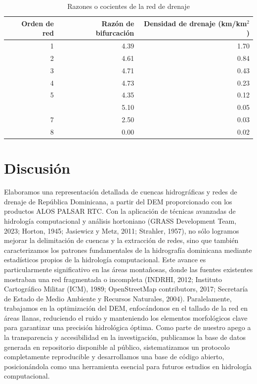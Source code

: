\documentclass[spanish]{article}
\begin{document}
\begin{table}[H]

\caption{\label{tab:tablaredesordratios}Razones o cocientes de la red de drenaje}
\centering
\begin{tabular}[t]{rrr}
\toprule
Orden de red & Razón de bifurcación & Densidad de drenaje (km/km$^2$)\\
\midrule
1 & 4.39 & 1.70\\
2 & 4.61 & 0.84\\
3 & 4.71 & 0.43\\
4 & 4.73 & 0.23\\
5 & 4.35 & 0.12\\
\addlinespace
6 & 5.10 & 0.05\\
7 & 2.50 & 0.03\\
8 & 0.00 & 0.02\\
\bottomrule
\end{tabular}
\end{table}

\hypertarget{discusiuxf3n}{%
\section{Discusión}\label{discusiuxf3n}}

Elaboramos una representación detallada de cuencas hidrográficas y redes
de drenaje de República Dominicana, a partir del DEM proporcionado con
los productos ALOS PALSAR RTC. Con la aplicación de técnicas avanzadas
de hidrología computacional y análisis hortoniano (GRASS Development
Team, 2023; Horton, 1945; Jasiewicz y Metz, 2011; Strahler, 1957), no
sólo logramos mejorar la delimitación de cuencas y la extracción de
redes, sino que también caracterizamos los patrones fundamentales de la
hidrografía dominicana mediante estadísticos propios de la hidrología
computacional. Este avance es particularmente significativo en las áreas
montañosas, donde las fuentes existentes mostraban una red fragmentada o
incompleta (INDRHI, 2012; Instituto Cartográfico Militar (ICM), 1989;
OpenStreetMap contributors, 2017; Secretaría de Estado de Medio Ambiente
y Recursos Naturales, 2004). Paralelamente, trabajamos en la
optimización del DEM, enfocándonos en el tallado de la red en áreas
llanas, reduciendo el ruido y manteniendo los elementos morfológicos
clave para garantizar una precisión hidrológica óptima. Como parte de
nuestro apego a la transparencia y accesibilidad en la investigación,
publicamos la base de datos generada en repositorio disponible al
público, sistematizamos un protocolo completamente reproducible y
desarrollamos una base de código abierto, posicionándola como una
herramienta esencial para futuros estudios en hidrología computacional.
\end{document}
